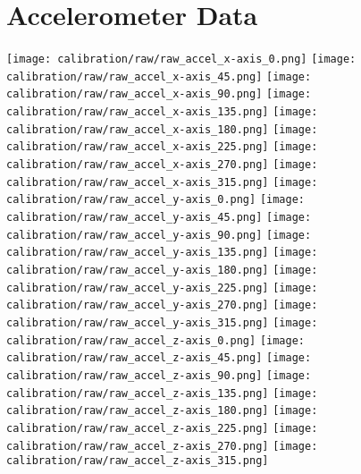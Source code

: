 \section{Accelerometer Data}
\texttt{[image: calibration/raw/raw\_accel\_x-axis\_0.png]}
\texttt{[image: calibration/raw/raw\_accel\_x-axis\_45.png]}
\texttt{[image: calibration/raw/raw\_accel\_x-axis\_90.png]}
\texttt{[image: calibration/raw/raw\_accel\_x-axis\_135.png]}
\texttt{[image: calibration/raw/raw\_accel\_x-axis\_180.png]}
\texttt{[image: calibration/raw/raw\_accel\_x-axis\_225.png]}
\texttt{[image: calibration/raw/raw\_accel\_x-axis\_270.png]}
\texttt{[image: calibration/raw/raw\_accel\_x-axis\_315.png]}
\texttt{[image: calibration/raw/raw\_accel\_y-axis\_0.png]}
\texttt{[image: calibration/raw/raw\_accel\_y-axis\_45.png]}
\texttt{[image: calibration/raw/raw\_accel\_y-axis\_90.png]}
\texttt{[image: calibration/raw/raw\_accel\_y-axis\_135.png]}
\texttt{[image: calibration/raw/raw\_accel\_y-axis\_180.png]}
\texttt{[image: calibration/raw/raw\_accel\_y-axis\_225.png]}
\texttt{[image: calibration/raw/raw\_accel\_y-axis\_270.png]}
\texttt{[image: calibration/raw/raw\_accel\_y-axis\_315.png]}
\texttt{[image: calibration/raw/raw\_accel\_z-axis\_0.png]}
\texttt{[image: calibration/raw/raw\_accel\_z-axis\_45.png]}
\texttt{[image: calibration/raw/raw\_accel\_z-axis\_90.png]}
\texttt{[image: calibration/raw/raw\_accel\_z-axis\_135.png]}
\texttt{[image: calibration/raw/raw\_accel\_z-axis\_180.png]}
\texttt{[image: calibration/raw/raw\_accel\_z-axis\_225.png]}
\texttt{[image: calibration/raw/raw\_accel\_z-axis\_270.png]}
\texttt{[image: calibration/raw/raw\_accel\_z-axis\_315.png]}
